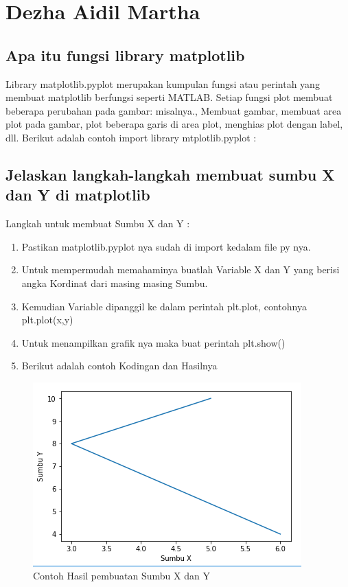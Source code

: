 \section{Dezha Aidil Martha}
\subsection{ Apa itu fungsi library matplotlib}
Library matplotlib.pyplot merupakan kumpulan fungsi atau perintah yang membuat matplotlib berfungsi seperti MATLAB. Setiap fungsi plot membuat beberapa perubahan pada gambar: misalnya., Membuat gambar, membuat area plot pada gambar, plot beberapa garis di area plot, menghias plot dengan label, dll. Berikut adalah contoh import library mtplotlib.pyplot :



\subsection{Jelaskan langkah-langkah membuat sumbu X dan Y di matplotlib}
Langkah untuk membuat Sumbu X dan Y :
\begin{enumerate}
	\item Pastikan matplotlib.pyplot nya sudah di import kedalam file py nya.
	\item Untuk mempermudah memahaminya buatlah Variable X dan Y yang berisi angka Kordinat dari masing masing Sumbu.
	\item Kemudian Variable dipanggil ke dalam perintah plt.plot, contohnya plt.plot(x,y)
	\item Untuk menampilkan grafik nya maka buat perintah plt.show()
	\item Berikut adalah contoh Kodingan dan Hasilnya
\end{enumerate}


\begin{figure}[h]
\centering
\includegraphics[scale=0.7]{figures/6/Teori/1174025/no2.png}
\caption{Contoh Hasil pembuatan Sumbu X dan Y}
\label{fig:contoh}
\end{figure}

